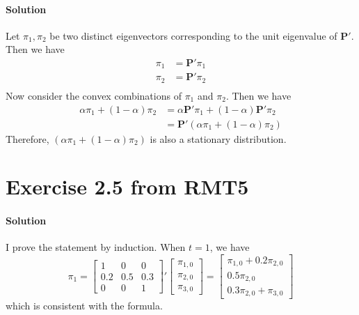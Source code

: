 \documentclass[11pt]{article}
\theoremstyle{definition}
\theoremstyle{boldtitle} %
\numberwithin{equation}{section}
\numberwithin{figure}{section}
\numberwithin{table}{section}
\begin{document}
\paragraph{Solution}
Let $\pi_1, \pi_2$ be two distinct eigenvectors corresponding to the unit eigenvalue of $\mathbf{P}'$.
Then we have 
\begin{align*}
    \pi_1 & = \mathbf{P}' \pi_1 \\
    \pi_2 & = \mathbf{P}' \pi_2 \\
\end{align*}
Now consider the convex combinations of $\pi_1$ and $\pi_2$.
Then we have 
\begin{align*}
    \alpha \pi_1 + (1-\alpha) \pi_2 & = \alpha \mathbf{P}'  \pi_1 + (1-\alpha) \mathbf{P}' \pi_2 \\
    & = \mathbf{P}' \left(\alpha \pi_1 + (1-\alpha) \pi_2 \right)
\end{align*}
Therefore, $\left(\alpha \pi_1 + (1-\alpha) \pi_2 \right)$ is also a stationary distribution.


\section*{Exercise 2.5 from RMT5}
\paragraph{Solution} I prove the statement by induction.
When $t=1$, we have 
\[
\pi_1 =
\left[
\begin{matrix}
  1 & 0 & 0 \\ 0.2 & 0.5 & 0.3 \\ 0 & 0 & 1
\end{matrix}
\right]' 
\left[
\begin{matrix}
  \pi_{1,0} \\ \pi_{2,0} \\ \pi_{3,0}
\end{matrix}
\right] = 
\left[
\begin{matrix}
  \pi_{1,0} + 0.2 \pi_{2,0} \\ 0.5 \pi_{2,0} \\ 0.3 \pi_{2,0} + \pi_{3,0}
\end{matrix}
\right]
\]
which is consistent with the formula.
\end{document}
